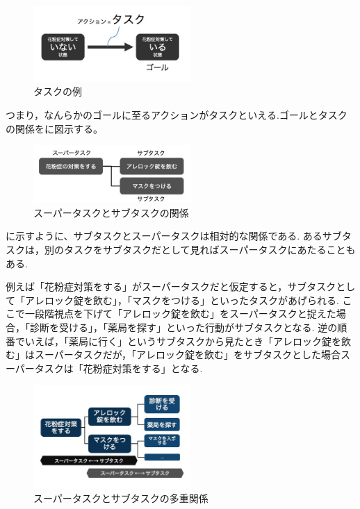 \documentclass[submit,techreq]{ipsj}
\begin{document}
\begin{figure}[tb]
\includegraphics[width=6cm, bb=0 0 450 300]{action_task.jpg}
\caption{タスクの例}
\label{fig:action_taskl}
\end{figure}

つまり，なんらかのゴールに至るアクションがタスクといえる.ゴールとタスクの関係をに図示する。

\begin{figure}[tb]
\includegraphics[width=6cm, bb=0 0 400 272]{super_sub.jpg}
\caption{スーパータスクとサブタスクの関係}
\label{fig:super_sub}
\end{figure}

に示すように、サブタスクとスーパータスクは相対的な関係である. あるサブタスクは，別のタスクをサブタスクだとして見ればスーパータスクにあたることもある.

例えば「花粉症対策をする」がスーパータスクだと仮定すると，サブタスクとして「アレロック錠を飲む」，「マスクをつける」といったタスクがあげられる. ここで一段階視点を下げて「アレロック錠を飲む」をスーパータスクと捉えた場合，「診断を受ける」，「薬局を探す」といった行動がサブタスクとなる. 逆の順番でいえば，「薬局に行く」というサブタスクから見たとき「アレロック錠を飲む」はスーパータスクだが，「アレロック錠を飲む」をサブタスクとした場合スーパータスクは「花粉症対策をする」となる.

\begin{figure}[tb]
\includegraphics[width=6cm, bb=0 0 350 319]{super_sub_sub.jpg}
\caption{スーパータスクとサブタスクの多重関係}
\label{fig:single}
\end{figure}
\end{document}
